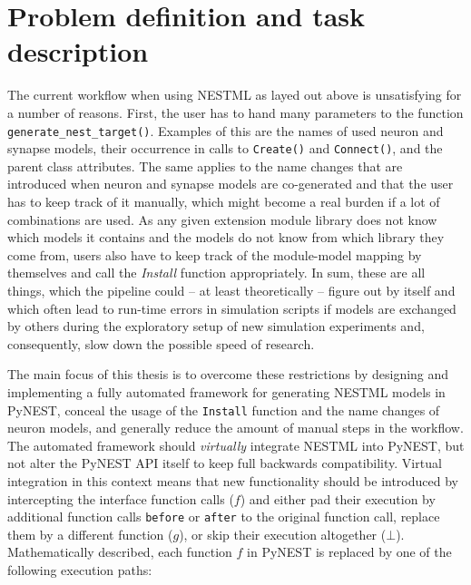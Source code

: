 \section{Problem definition and task description}

The current workflow when using NESTML as layed out above is unsatisfying for a number of reasons. First, the user has to hand many parameters to the function \texttt{generate\_nest\_target()}. Examples of this are the names of used neuron and synapse models, their occurrence in calls to \texttt{Create()} and \texttt{Connect()}, and the parent class attributes. The same applies to the name changes that are introduced when neuron and synapse models are co-generated and that the user has to keep track of it manually, which might become a real burden if a lot of combinations are used. As any given extension module library does not know which models it contains and the models do not know from which library they come from, users also have to keep track of the module-model mapping by themselves and call the \emph{Install} function appropriately. In sum, these are all things, which the pipeline could -- at least theoretically -- figure out by itself and which often lead to run-time errors in simulation scripts if models are exchanged by others during the exploratory setup of new simulation experiments and, consequently, slow down the possible speed of research. 

The main focus of this thesis is to overcome these restrictions by designing and implementing a fully automated framework for generating NESTML models in PyNEST, conceal the usage of the \texttt{Install} function and the name changes of neuron models, and generally reduce the amount of manual steps in the workflow. The automated framework should \emph{virtually} integrate NESTML into PyNEST, but not alter the PyNEST API itself to keep full backwards compatibility. Virtual integration in this context means that new functionality should be introduced by intercepting the interface function calls ($f$) and either pad their execution by additional function calls \texttt{before} or \texttt{after} to the original function call, replace them by a different function ($g$), or skip their execution altogether ($\bot$). Mathematically described, each function $f$ in PyNEST is replaced by one of the following execution paths:

